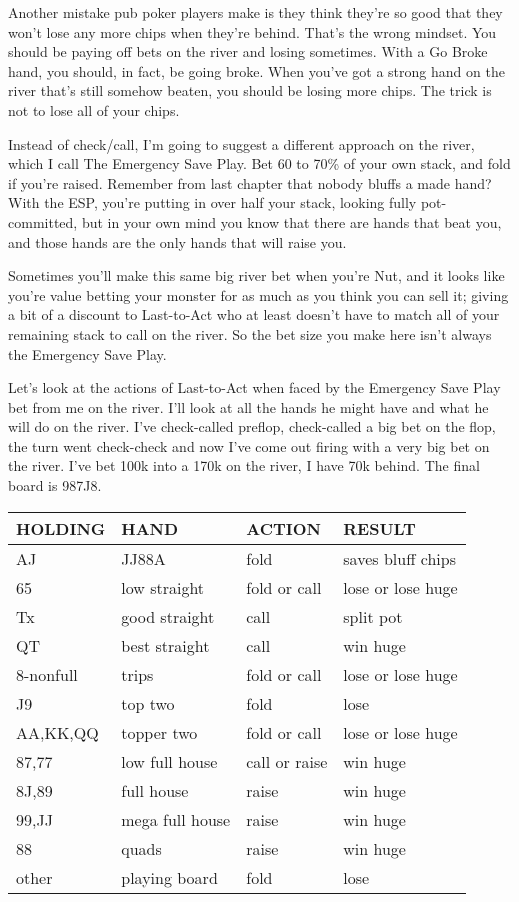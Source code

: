 Another mistake pub poker players make is they think they're so good
that they won't lose any more chips when they're behind. That's the
wrong mindset. You should be paying off bets on the river and losing
sometimes. With a Go Broke hand, you should, in fact, be going broke.
When you've got a strong hand on the river that's still
somehow beaten, you should be losing more chips. The trick is not
to lose all of your chips.

Instead of check/call, I'm going to suggest a different approach on
the river, which I call The Emergency Save Play. Bet 60 to 70\% of
your own stack, and fold if you're raised. Remember from last chapter
that nobody bluffs a made hand? With the ESP, you're putting in over
half your stack, looking fully pot-committed, but in your own mind you
know that there are hands that beat you, and those hands are the
only hands that will raise you.

Sometimes you'll make this same big river bet when you're Nut, and it
looks like you're value betting your monster for as much as you think
you can sell it; giving a bit of a discount to Last-to-Act who at
least doesn't have to match all of your remaining stack to call on the
river. So the bet size you make here isn't always the Emergency Save
Play.

Let's look at the actions of Last-to-Act when faced by the Emergency
Save Play bet from me on the river. I'll look at all the hands he
might have and what he will do on the river.
I've check-called preflop, check-called a big bet on the flop, the
turn went check-check and now I've come out firing with a very big bet
on the river. I've bet 100k into a 170k on the river, I have 70k
behind. The final board is 987J8.

\begin{tabular}{|l|l|l|l|} \hline
HOLDING & HAND & ACTION & RESULT\\ \hline
AJ      & JJ88A & fold  & saves bluff chips\\ \hline
65      & low straight  & fold or call & lose or lose huge\\ \hline
Tx      & good straight & call & split pot\\ \hline
QT      & best straight & call & win huge\\ \hline
8-nonfull & trips       & fold or call & lose or lose huge\\ \hline
J9      & top two       & fold & lose\\ \hline
AA,KK,QQ & topper two   & fold or call  & lose or lose huge\\ \hline
87,77 & low full house  & call or raise & win huge\\ \hline
8J,89 & full house      & raise & win huge\\ \hline
99,JJ & mega full house & raise & win huge\\ \hline
88      & quads         & raise & win huge\\ \hline
other   & playing board & fold  & lose\\ \hline
\end{tabular}


